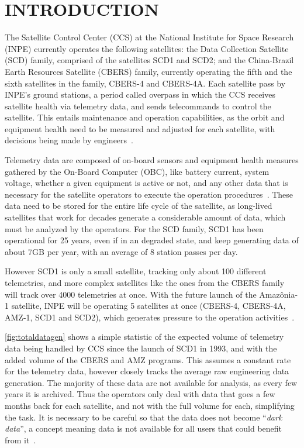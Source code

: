 
\chapter{INTRODUCTION}\label{ch:intro}

The Satellite Control Center (CCS) at the National Institute for Space Research (INPE) currently operates the following satellites: the Data Collection Satellite (SCD) family, comprised of the satellites SCD1 and SCD2; and the China-Brazil Earth Resources Satellite (CBERS) family, currently operating the fifth and the sixth satellites in the family, CBERS-4 and CBERS-4A.
Each satellite pass by INPE's ground stations, a period called overpass in which the CCS receives satellite health via telemetry data, and sends telecommands to control the satellite.
This entails maintenance and operation capabilities, as the orbit and equipment health need to be measured and adjusted for each satellite, with decisions being made by engineers~\cite{AzevedoAmbr:2010:ArSaTe}.

Telemetry data are composed of on-board sensors and equipment health measures gathered by the On-Board Computer (OBC), like battery current, system voltage, whether a given equipment is active or not, and any other data that is necessary for the satellite operators to execute the operation procedures~\cite{larsonSpaceMissionAnalysis1999}.
These data need to be stored for the entire life cycle of the satellite, as long-lived satellites that work for decades generate a considerable amount of data, which must be analyzed by the operators.
For the SCD family, SCD1 has been operational for 25 years, even if in an degraded state, and keep generating data of about 7GB per year, with an average of 8 station passes per day.

However SCD1 is only a small satellite, tracking only about 100 different telemetries, and more complex satellites like the ones from the CBERS family will track over 4000 telemetries at once.
With the future launch of the Amazônia-1 satellite, INPE will be operating 5 satellites at once (CBERS-4, CBERS-4A, AMZ-1, SCD1 and SCD2), which generates pressure to the operation activities~\cite{JulioFoAmbrFerrLour:2017:ChImSp}.

\autoref{fig:totaldatagen} shows a simple statistic of the expected volume of telemetry data being handled by CCS since the launch of SCD1 in 1993, and with the added volume of the CBERS and AMZ programs.
This assumes a constant rate for the telemetry data, however closely tracks the average raw engineering data generation.
The majority of these data are not available for analysis, as every few years it is archived.
Thus the operators only deal with data that goes a few months back for each satellite, and not with the full volume for each, simplifying the task.
It is necessary to be careful so that the data does not become ``\textit{dark data}'', a concept meaning data is not available for all users that could benefit from it~\cite{heidornSheddingLightDark2008}.


